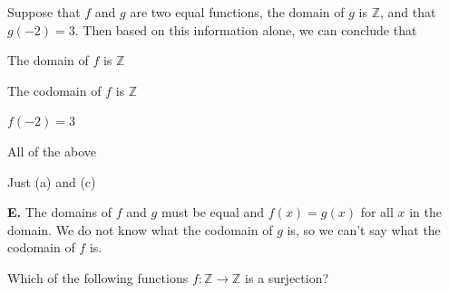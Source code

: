 \documentclass[addpoints]{exam}
\begin{document}
\begin{questions}
\question[2] Suppose that $f$ and $g$ are two equal functions, the domain of $g$ is $\mathbb{Z}$, and that $g(-2) = 3$. Then based on this information alone, we can conclude that 
	\begin{parts}
		\item The domain of $f$ is $\mathbb{Z}$
		\item The codomain of $f$ is $\mathbb{Z}$
		\item $f(-2) = 3$
		\item All of the above
		\item Just (a) and (c)
	\end{parts}
	
	\begin{solution}
		\textbf{E.} The domains of $f$ and $g$ must be equal and $f(x) = g(x)$ for all $x$ in the domain. We do not know what the codomain of $g$ is, so we can't say what the codomain of $f$ is. 
	\end{solution}
	



\question[2] Which of the following functions $f: \mathbb{Z} \to \mathbb{Z}$ is a surjection? 


\end{questions}
\end{document}
